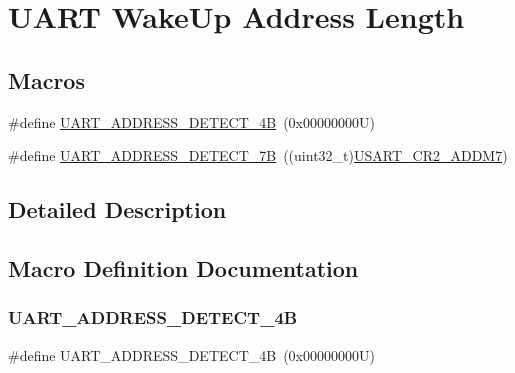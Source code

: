 \hypertarget{group___u_a_r_t___wake_up___address___length}{}\section{U\+A\+RT Wake\+Up Address Length}
\label{group___u_a_r_t___wake_up___address___length}
\subsection*{Macros}
\begin{DoxyCompactItemize}
\item 
\#define \hyperlink{group___u_a_r_t___wake_up___address___length_ga6599292020c484faeea894307d9dc6d5}{U\+A\+R\+T\+\_\+\+A\+D\+D\+R\+E\+S\+S\+\_\+\+D\+E\+T\+E\+C\+T\+\_\+4B}~(0x00000000\+U)
\item 
\#define \hyperlink{group___u_a_r_t___wake_up___address___length_ga4dbd5995e0e4998cb1a312c183d7cbb0}{U\+A\+R\+T\+\_\+\+A\+D\+D\+R\+E\+S\+S\+\_\+\+D\+E\+T\+E\+C\+T\+\_\+7B}~((uint32\+\_\+t)\hyperlink{group___peripheral___registers___bits___definition_ga2d8588feb26d8b36054a060d6b691823}{U\+S\+A\+R\+T\+\_\+\+C\+R2\+\_\+\+A\+D\+D\+M7})
\end{DoxyCompactItemize}


\subsection{Detailed Description}


\subsection{Macro Definition Documentation}
\mbox{\label{group___u_a_r_t___wake_up___address___length_ga6599292020c484faeea894307d9dc6d5}} 
\subsubsection{\texorpdfstring{U\+A\+R\+T\+\_\+\+A\+D\+D\+R\+E\+S\+S\+\_\+\+D\+E\+T\+E\+C\+T\+\_\+4B}{UART\_ADDRESS\_DETECT\_4B}}
{\footnotesize\ttfamily \#define U\+A\+R\+T\+\_\+\+A\+D\+D\+R\+E\+S\+S\+\_\+\+D\+E\+T\+E\+C\+T\+\_\+4B~(0x00000000\+U)}

